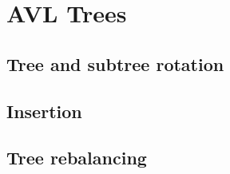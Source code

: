 \chapter{AVL Trees}
\label{chap:avltrees}

\section{Tree and subtree rotation}

\section{Insertion}

\section{Tree rebalancing}